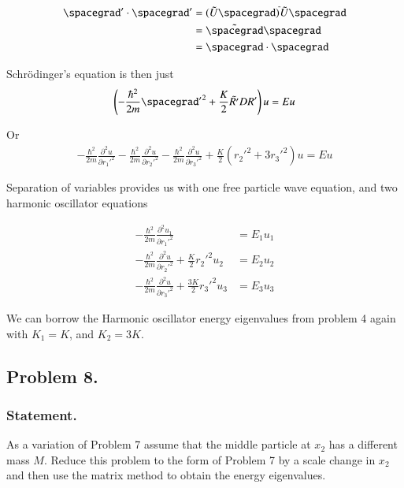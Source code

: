 \begin{align*}
\spacegrad' \cdot \spacegrad' 
&= 
(\tilde{U} \spacegrad)^{\tilde{}} \tilde{U} \spacegrad \\
&= 
\tilde{\spacegrad } \spacegrad \\
&= 
\spacegrad \cdot \spacegrad
\end{align*}

Schr\"{o}dinger's equation is then just
\begin{align}\label{eqn:desaiCh9:708}
\left( -\frac{\hbar^2}{2m} {\spacegrad'}^2 + \frac{K}{2} \tilde{R'} D R' \right) u = E u
\end{align}

Or
\begin{align}\label{eqn:desaiCh9:708b}
-\frac{\hbar^2}{2m} \frac{\partial^2 u}{\partial {r_1'}^2}
-\frac{\hbar^2}{2m} \frac{\partial^2 u}{\partial {r_2'}^2}
-\frac{\hbar^2}{2m} \frac{\partial^2 u}{\partial {r_3'}^2}
+ \frac{K}{2}
\left(
{r_2'}^2
+3 {r_3'}^2
\right) u
= E u
\end{align}

Separation of variables provides us with one free particle wave equation, and two harmonic oscillator equations

\begin{align}\label{eqn:desaiCh9:708c}
-\frac{\hbar^2}{2m} \frac{\partial^2 u_1}{\partial {r_1'}^2} &= E_1 u_1 \\
-\frac{\hbar^2}{2m} \frac{\partial^2 u}{\partial {r_2'}^2} + \frac{K}{2} {r_2'}^2 u_2 &= E_2 u_2 \\
-\frac{\hbar^2}{2m} \frac{\partial^2 u}{\partial {r_3'}^2} + \frac{3 K}{2} {r_3'}^2 u_3 &= E_3 u_3
\end{align}

We can borrow the Harmonic oscillator energy eigenvalues from problem 4 again with $K_1 = K$, and $K_2 = 3 K$.

\subsection{Problem 8.}
\subsubsection{Statement.}

As a variation of Problem 7 assume that the middle particle at $x_2$ has a different mass $M$.  Reduce this problem to the form of Problem 7 by a scale change in $x_2$ and then use the matrix method to obtain the energy eigenvalues.

